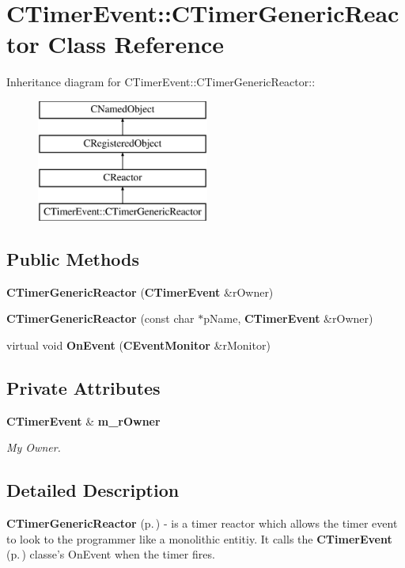 \section{CTimer\-Event::CTimer\-Generic\-Reactor  Class Reference}
\label{classCTimerEvent_1_1CTimerGenericReactor}
Inheritance diagram for CTimer\-Event::CTimer\-Generic\-Reactor::\begin{figure}[H]
\begin{center}
\leavevmode
\includegraphics[height=4cm]{classCTimerEvent_1_1CTimerGenericReactor}
\end{center}
\end{figure}
\subsection*{Public Methods}
\begin{CompactItemize}
\item 
{\bf CTimer\-Generic\-Reactor} ({\bf CTimer\-Event} \&r\-Owner)
\item 
{\bf CTimer\-Generic\-Reactor} (const char $\ast$p\-Name, {\bf CTimer\-Event} \&r\-Owner)
\item 
virtual void {\bf On\-Event} ({\bf CEvent\-Monitor} \&r\-Monitor)
\end{CompactItemize}
\subsection*{Private Attributes}
\begin{CompactItemize}
\item 
{\bf CTimer\-Event} \& {\bf m\_\-r\-Owner}
\begin{CompactList}\small\item\em My Owner.\item\end{CompactList}\end{CompactItemize}


\subsection{Detailed Description}
{\bf CTimer\-Generic\-Reactor} {\rm (p.\,\pageref{classCTimerEvent_1_1CTimerGenericReactor})} - is a timer reactor which allows the timer event to look to the programmer like a monolithic entitiy. It calls the {\bf CTimer\-Event} {\rm (p.\,\pageref{classCTimerEvent})} classe's On\-Event when the timer fires. 



